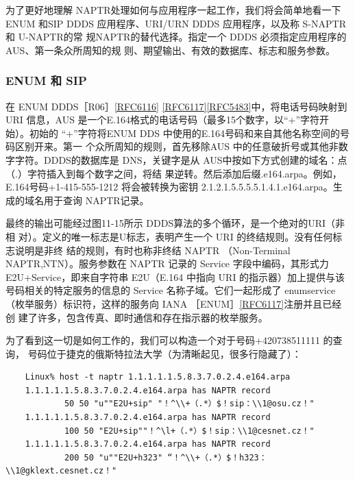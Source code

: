 为了更好地理解 NAPTR处理如何与应用程序一起工作，我们将会简单地看一下 ENUM
和SIP DDDS 应用程序、URI/URN DDDS 应用程序，以及称 S-NAPTR 和 U-NAPTR的常
规NAPTR的替代选择。指定一个 DDDS 必须指定应用程序的AUS、第一条众所周知的规
则、期望输出、有效的数据库、标志和服务参数。

\subsubsection{ENUM 和 SIP}

在 ENUM DDDS［R06］\href{https://www.rfc-editor.org/rfc/rfc6116}{[RFC6116]} \href{https://www.rfc-editor.org/rfc/rfc6117}{[RFC6117]}\href{https://www.rfc-editor.org/rfc/rfc5483}{[RFC5483]}中，将电话号码映射到URI
信息，AUS 是一个E.164格式的电话号码（最多15个数字，以“+”字符开始）。初始的
“+”字符将ENUM DDS 中使用的E.164号码和来自其他名称空间的号码区别开来。第一
个众所周知的规则，首先移除AUS 中的任意破折号或其他非数字字符。DDDS的数据库是
DNS，关键字是从 AUS中按如下方式创建的域名：点（.）字符插入到每个数字之间，将结
果逆转。然后添加后缀.e164.arpa。例如，E.164号码+1-415-555-1212 将会被转换为密钥
2.1.2.1.5.5.5.5.1.4.1.e164.arpa。生成的域名用于查询 NAPTR记录。

最终的输出可能经过图11-15所示 DDDS算法的多个循环，是一个绝对的URI（非相
对）。定义的唯一标志是U标志，表明产生一个 URI 的终结规则。没有任何标志说明是非终
结的规则，有时也称非终结 NAPTR （Non-Terminal NAPTR,NTN）。服务参数在 NAPTR
记录的 Service 字段中编码，其形式力 E2U+Service，即来自字符串 E2U（E.164 中指向 URI
的指示器）加上提供与该号码相关的特定服务的信息的 Service 名称子域。它们一起形成了
enumservice（枚举服务）标识符，这样的服务向 IANA ［ENUM］\href{https://www.rfc-editor.org/rfc/rfc6117}{[RFC6117]}注册并且已经创
建了许多，包含传真、即时通信和存在指示器的枚举服务。

为了看到这一切是如何工作的，我们可以构造一个对于号码+420738511111 的查询，
号码位于捷克的俄斯特拉法大学（为清晰起见，很多行隐藏了）：

\begin{verbatim}
    Linux% host -t naptr 1.1.1.1.1.5.8.3.7.0.2.4.e164.arpa
    1.1.1.1.1.5.8.3.7.0.2.4.e164.arpa has NAPTR record
            50 50 "u""E2U+sip" "！^\\+（.*）$！sip：\\1@osu.cz！"
    1.1.1.1.1.5.8.3.7.0.2.4.e164.arpa has NAPTR record
            100 50 "E2U+sip""！^\l+（.*）$！sip：\\1@cesnet.cz！"
    1.1.1.1.1.5.8.3.7.0.2.4.e164.arpa has NAPTR record
            200 50 "u""E2U+h323" “！^\\+（.*）$！h323：\\1@gklext.cesnet.cz！"
\end{verbatim}

